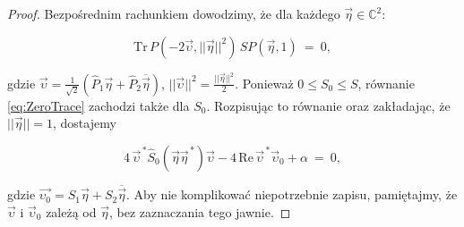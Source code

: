 {\begin{proof}
Bezpośrednim rachunkiem dowodzimy, że dla każdego
$\vec{\eta} \in \mathbb{C}^{2}$:
\begin{linenomath*}
 \begin{equation}
 \label{eq:ZeroTrace}
 \text{Tr} \, P(-2\vec{\upsilon}, ||\vec{\eta}||^{2}) \, S P(\vec{\eta},1)
     \:=\: 0,
 \end{equation}
\end{linenomath*}
gdzie $\vec{\upsilon} =
 \frac{1}{\sqrt{2}} \left(
  \hat{P}_{1} \vec{\eta} + \hat{P}_{2} \overline{\vec{\eta}}
 \right)$,
$||\vec{\upsilon}||^{2} = \tfrac{||\vec{\eta}||^{2}}{2}$.
Ponieważ $0 \leq S_{0} \leq S$, równanie
\eqref{eq:ZeroTrace} zachodzi także dla $S_{0}$.
Rozpisując to równanie oraz zakładając, że $||\vec{\eta}|| = 1$,
dostajemy
\begin{linenomath*}
 \begin{equation}
 \label{eq:ZeroTraceExplicit}
 4 \, \vec{\upsilon}^{\,*} \hat{S}_{0}(\vec{\eta} \vec{\eta}^{\,*}) \vec{\upsilon} -
 4 \, \text{Re} \, \vec{\upsilon}^{\,*} \vec{\upsilon}_{0} + \alpha \: = \: 0,
 \end{equation}
\end{linenomath*}
gdzie $\vec{\upsilon_{0}} = S_{1} \vec{\eta} + S_{2} \overline{\vec{\eta}}$.
Aby nie komplikować niepotrzebnie zapisu,
pamiętajmy, że $\vec{\upsilon}$ i $\vec{\upsilon}_{0}$ zależą od $\vec{\eta}$,
bez zaznaczania tego jawnie.


\end{proof}}
